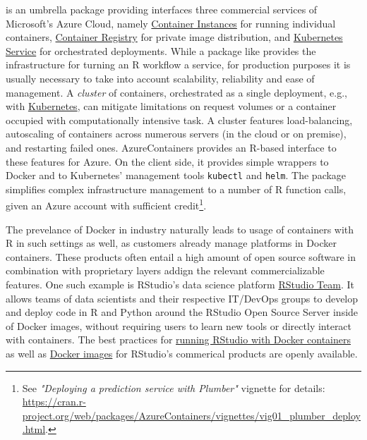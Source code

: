 \label{azurecontainers} \textbf{} is an
umbrella package providing interfaces three commercial services of
Microsoft's Azure Cloud, namely
\href{https://azure.microsoft.com/en-us/services/container-instances/}{Container
Instances} for running individual containers,
\href{https://azure.microsoft.com/en-us/services/container-registry/}{Container
Registry} for private image distribution, and
\href{https://azure.microsoft.com/en-us/services/kubernetes-service/}{Kubernetes
Service} for orchestrated deployments. While a package like
 provides the infrastructure for turning an R workflow
a service, for production purposes it is usually necessary to take into
account scalability, reliability and ease of management. A
\emph{cluster} of containers, orchestrated as a single deployment, e.g.,
with \href{https://kubernetes.io}{Kubernetes}, can mitigate limitations
on request volumes or a container occupied with computationally
intensive task. A cluster features load-balancing, autoscaling of
containers across numerous servers (in the cloud or on premise), and
restarting failed ones. AzureContainers provides an R-based interface to
these features for Azure. On the client side, it provides simple
wrappers to Docker and to Kubernetes' management tools \texttt{kubectl}
and \texttt{helm}. The package simplifies complex infrastructure
management to a number of R function calls, given an Azure account with
sufficient
credit\footnote{See \emph{"Deploying a prediction service with Plumber"} vignette for details:  \href{https://cran.r-project.org/web/packages/AzureContainers/vignettes/vig01_plumber_deploy.html}{https://cran.r-project.org/web/packages/AzureContainers/vignettes/vig01\_plumber\_deploy.html}.}.

The prevelance of Docker in industry naturally leads to usage of
containers with R in such settings as well, as customers already manage
platforms in Docker containers. These products often entail a high
amount of open source software in combination with proprietary layers
addign the relevant commercializable features. One such example is
RStudio's data science platform
\href{https://rstudio.com/products/team/}{RStudio Team}. It allows teams
of data scientists and their respective IT/DevOps groups to develop and
deploy code in R and Python around the RStudio Open Source Server inside
of Docker images, without requiring users to learn new tools or directly
interact with containers. The best practices for
\href{https://support.rstudio.com/hc/en-us/articles/360021594513-Running-RStudio-with-Docker-containers}{running
RStudio with Docker containers} as well as
\href{https://github.com/rstudio/rstudio-docker-products}{Docker images}
for RStudio's commerical products are openly available.

